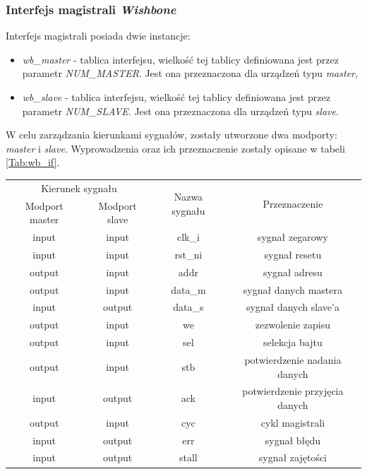 \documentclass[11pt,a4paper]{article}
\begin{document}
\subsubsection{Interfejs magistrali \textit{Wishbone}}
Interfejs magistrali posiada dwie instancje:
\begin{itemize}
\item \textit{wb\_master} - tablica interfejsu, wielkość tej tablicy definiowana jest przez parametr \textit{NUM\_MASTER}. Jest ona przeznaczona dla urządzeń typu \textit{master},
\item \textit{wb\_slave} - tablica interfejsu, wielkość tej tablicy definiowana jest przez parametr \textit{NUM\_SLAVE}. Jest ona przeznaczona dla urządzeń typu \textit{slave}.
 \end{itemize}
 W celu zarządzania kierunkami sygnałów, zostały utworzone dwa modporty: \textit{master} i \textit{slave}. Wyprowadzenia oraz ich przeznaczenie zostały opisane w tabeli \ref{Tab:wb_if}.
 \\
 \begin{minipage}{\textwidth}
 \begin{center}
			\small
				\begin{tabular}{|c|c|c|c|}
					\hline
					\multicolumn{2}{|c|}{Kierunek sygnału} & \multirow{2}{*}{Nazwa sygnału} & \multirow{2}{*}{Przeznaczenie}\\
					\cline{1-2}
					Modport master & Modport slave & & \\ 
					\hline
					input & input & clk\_i & sygnał zegarowy \\
					\hline
					input & input & rst\_ni & sygnał resetu \\
					\hline
					output & input & addr & sygnał adresu\\
					\hline
					output & input & data\_m & sygnał danych mastera\\
					\hline
					input & output & data\_s & sygnał danych slave'a\\
					\hline
					output & input & we & zezwolenie zapisu\\
					\hline
					output & input & sel & selekcja bajtu\\
					\hline
					output & input & stb & potwierdzenie nadania danych\\
					\hline
					input & output & ack & potwierdzenie przyjęcia danych\\
					\hline
					output & input & cyc & cykl magistrali\\
					\hline
					input & output & err & sygnał błędu\\
					\hline
					input & output & stall & sygnał zajętości\\
					\hline
				\end{tabular}
				\end{center}
		\end{minipage}
\end{document}
